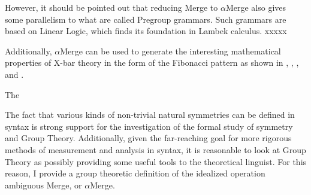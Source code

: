 \documentclass[11pt,twoside]{article}
\theoremstyle{plain}
\numberwithin{equation}{section}
\theoremstyle{definition}
\newtheorem{phrase string}{Phrase String}
\begin{document}
However, it should be pointed out that reducing Merge to $\alpha$Merge also gives some parallelism to what are called Pregroup grammars. Such grammars are based on Linear Logic, which finds its foundation in Lambek calculus. xxxxx

Additionally, $\alpha$Merge can be used to generate the interesting mathematical properties of X-bar theory in the form of the Fibonacci pattern as shown in \cite{medeiros:2008}, \cite{soschen:2008}, \cite{ppuri:2008}, and \cite{boeckx08bare}. 

The   
 
The fact that various kinds of non-trivial natural symmetries can be defined in syntax is strong support for the investigation of the formal study of symmetry and Group Theory. Additionally, given the far-reaching goal for more rigorous methods of measurement and analysis in syntax, it is reasonable to look at Group Theory as possibly providing some useful tools to the theoretical linguist. For this reason, I provide a group theoretic definition of the idealized operation ambiguous Merge, or $\alpha$Merge.
   



\end{document}
